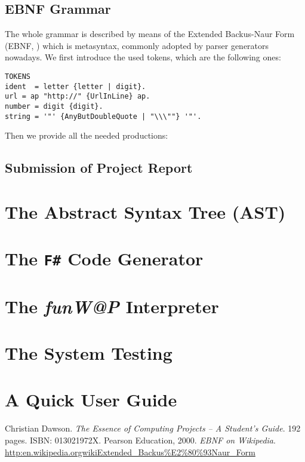 \documentclass[]{final_report}
\begin{document}
\section{EBNF Grammar}

The whole grammar is described by means of the Extended Backus-Naur Form (EBNF, \cite{ebnf}) which is metasyntax, commonly adopted by parser generators nowadays. We first introduce the used tokens, which are the following ones:

\begin{lstlisting}
TOKENS
ident  = letter {letter | digit}.
url = ap "http://" {UrlInLine} ap.
number = digit {digit}.
string = '"' {AnyButDoubleQuote | "\\\""} '"'.
\end{lstlisting}

Then we provide all the needed productions:

\section{Submission of Project Report}

\chapter{\label{chapter3} The Abstract Syntax Tree (AST)}

\chapter{\label{chapter4} The \texttt{F\#} Code Generator}

\chapter{\label{chapter5} The \textit{funW@P} Interpreter}
\chapter{\label{chapter6} The System Testing}
\chapter{\label{chapter7} A Quick User Guide}

\newpage
\begin{thebibliography}{99}
 Christian Dawson. \emph{The Essence of Computing Projects -- A Student's Guide}. 192 pages. ISBN: 013021972X. Pearson Education, 2000.
\emph{EBNF on Wikipedia}. \href{http:\/\/en.wikipedia.org\/wiki\/Extended\_Backus\%E2\%80\%93Naur\_Form}{http:\/\/en.wikipedia.org\/wiki\/Extended\_Backus\%E2\%80\%93Naur\_Form}
\end{thebibliography}
\end{document}
